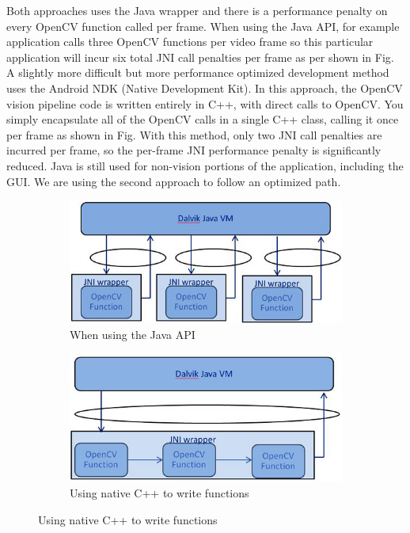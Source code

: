 Both approaches uses the Java wrapper and there is a performance penalty on every OpenCV function called per frame. When using the Java API, for example application calls three OpenCV functions per video frame so this particular application will incur six total JNI call penalties per frame as per shown in Fig. A slightly more difficult but more performance optimized development method uses the Android NDK (Native Development Kit). In this approach, the OpenCV vision pipeline code is written entirely in C++, with direct calls to OpenCV. You simply encapsulate all of the OpenCV calls in a single C++ class, calling it once per frame as shown in Fig. With this method, only two JNI call penalties are incurred per frame, so the per-frame JNI performance penalty is significantly reduced. Java is still used for non-vision portions of the application, including the GUI. We are using the second approach to follow an optimized path. 


\begin{figure}[t]
\begin{subfigure}[b]{0.5\textwidth}
\centering
\includegraphics[width=0.85\linewidth]{img/lane12.png}
\caption{When using the Java API}
\label{fig:lane12}
\end{subfigure}
\begin{subfigure}[b]{0.5\textwidth}
\centering
\includegraphics[width=0.85\linewidth]{img/lane13.png}
\caption{Using native C++ to write functions}
\label{fig:lane13}
\end{subfigure}
\end{figure}

